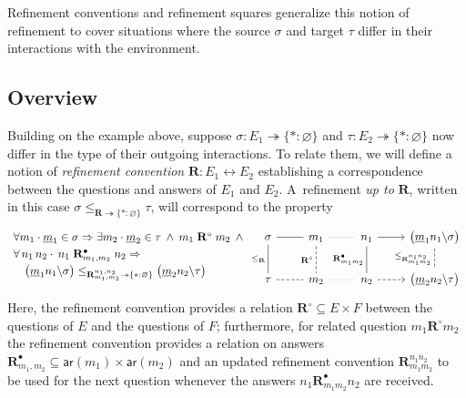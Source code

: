 \documentclass[acmsmall,screen,review,nonacm]{acmart}
\newcommand{\kw}[1]{\ensuremath{ \mathsf{#1} }}
\begin{document}
Refinement conventions and refinement squares
generalize this notion of refinement
to cover situations where the source $\sigma$ and target $\tau$
differ in their interactions with the environment.


\subsection{Overview} %

Building on the example above, suppose
$\sigma : E_1 \twoheadrightarrow \{* : \varnothing\}$ and
$\tau : E_2 \twoheadrightarrow \{* : \varnothing\}$
now differ in the type of their outgoing interactions.
To relate them,
we will define a notion of \emph{refinement convention}
$\mathbf{R} : E_1 \leftrightarrow E_2$
establishing a correspondence between
the questions and answers of $E_1$ and $E_2$.
A~refinement \emph{up to} $\mathbf{R}$,
written in this case
$\sigma \le_{\mathbf{R} \twoheadrightarrow \{*:\varnothing\}} \tau$,
will correspond to the property
\begin{equation} \label{eqn:simupto}
  \begin{array}{l}
  \forall m_1 \cdot \underline{m}_1 \in \sigma \Rightarrow {}
  \exists m_2 \cdot \underline{m}_2 \in \tau \:\wedge\:
    m_1 \mathrel{\mathbf{R}^\circ} m_2 \:\wedge\: {}
  \\[0.66ex]
  \forall \, n_1 \, n_2 \cdot \:
    n_1 \mathrel{\mathbf{R}^\bullet_{m_1,m_2}} n_2 \Rightarrow
  \\[0.66ex] \quad
    \bigl(\underline{m}_1 n_1 \backslash \sigma \bigr)
    \le_{\mathbf{R}_{m_1,m_2}^{n_1,n_2} \twoheadrightarrow \{*:\varnothing\}}
    \bigl(\underline{m}_2 n_2 \backslash \tau \bigr)
  \end{array}
  \hspace{-1ex} %
  \begin{tikzcd}
    \sigma \ar[r,dash] \ar[d, dash, "\le_\mathbf{R}"'] &
    m_1 \ar[r,dotted,dash] \ar[d,dash,dashed,"\mathbf{R}^\circ"'] &
    n_1 \ar[r] \ar[d,dash, "\mathbf{R}^\bullet_{m_1m_2}"'] &
    \bigl(\underline{m}_1 n_1 \backslash \sigma \bigr)
    \ar[d, dash, dashed, "\le_{\mathbf{R}_{m_1m_2}^{n_1n_2}}"']
    \\
    \tau \ar[r,dashed,dash] &
    m_2 \ar[r,dotted,dash] &
    n_2 \ar[r,dashed] &
    \bigl(\underline{m}_2 n_2 \backslash \tau \bigr)
  \end{tikzcd}
\end{equation}
Here,
the refinement convention provides a relation
$\mathbf{R}^\circ \subseteq E \times F$
between the questions of $E$ and the questions of $F$;
furthermore, for related question $m_1 \mathrel{\mathbf{R}^\circ} m_2$
the refinement convention provides a relation on answers
$\mathbf{R}^\bullet_{m_1,m_2} \subseteq \kw{ar}(m_1) \times \kw{ar}(m_2)$
and an updated refinement convention
$\mathbf{R}_{m_1m_2}^{n_1n_2}$ to be used for the next question
whenever the answers $n_1 \mathrel{\mathbf{R}^\bullet_{m_1m_2}} n_2$
are received.
\end{document}
